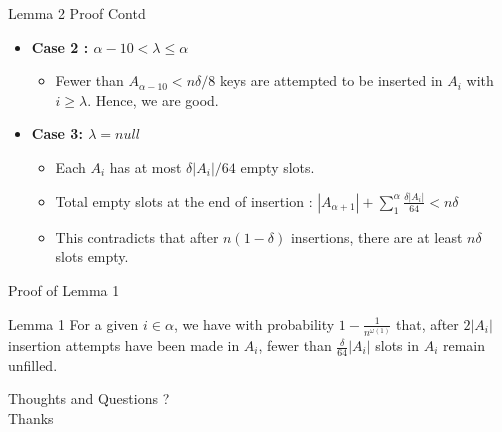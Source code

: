 \documentclass{beamer}
\begin{document}
\begin{frame}{Lemma 2 Proof Contd}
	\begin{itemize}
		\item {\bf Case 2 : $\alpha -10 < \lambda \le \alpha$} 
		\begin{itemize}
			\item Fewer than $A_{\alpha -10} < n \delta/8$ keys are attempted to be inserted in $A_i$ with $i\ge \lambda$. Hence, we are good.
		\end{itemize}
	\item {\bf Case 3: $\lambda = null$} 
	\begin{itemize}
		\item Each $A_i$ has at most $\delta |A_i|/64$ empty slots.
		\item Total empty slots at the end of insertion : $|A_{\alpha+1}| + \sum_{1}^{\alpha}\frac{\delta|A_i|}{64} < n\delta$
		\item This contradicts that after $n(1-\delta)$ insertions, there are at least $n\delta$ slots empty.
	\end{itemize}
	\end{itemize}
\end{frame}

\begin{frame}{Proof of Lemma 1}
		\begin{block}{Lemma 1}
		For a given $i \in \alpha$, we have with probability $1 - \frac{1}{n^{\omega(1)}}$ that, after $2|A_i|$ insertion attempts have been made in $A_i$, fewer than $\frac{\delta}{64} |A_i|$ slots in $A_i$ remain unfilled.
	\end{block}

\end{frame}

\begin{frame}
\begin{center}
{\sc \LARGE Thoughts and Questions ?} \\
\vspace{3cm}
{\sc \large Thanks} 
\end{center}
\end{frame}




%
\end{document}
